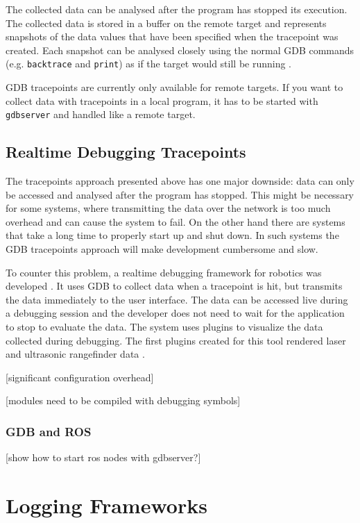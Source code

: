 The collected data can be analysed after the program has stopped its execution. The collected data is stored in a buffer on the remote target and represents snapshots of the data values that have been specified when the tracepoint was created. Each snapshot can be analysed closely using the normal GDB commands (e.g. \verb+backtrace+ and \verb+print+) as if the target would still be running \cite{Stallman2002}.

GDB tracepoints are currently only available for remote targets. If you want to collect data with tracepoints in a local program, it has to be started with \verb+gdbserver+ and handled like a remote target.

\subsection{Realtime Debugging Tracepoints}
The tracepoints approach presented above has one major downside: data can only be accessed and analysed after the program has stopped. This might be necessary for some systems, where transmitting the data over the network is too much overhead and can cause the system to fail. On the other hand there are systems that take a long time to properly start up and shut down. In such systems the GDB tracepoints approach will make development cumbersome and slow.

To counter this problem, a realtime debugging framework for robotics was developed \cite{Gumbley2009}. It uses GDB to collect data when a tracepoint is hit, but transmits the data immediately to the user interface. The data can be accessed live during a debugging session and the developer does not need to wait for the application to stop to evaluate the data. The system uses plugins to visualize the data collected during debugging. The first plugins created for this tool rendered laser and ultrasonic rangefinder data \cite{Gumbley2009}.

[significant configuration overhead]

[modules need to be compiled with debugging symbols]

\subsubsection{GDB and ROS}
[show how to start ros nodes with gdbserver?]


\section{Logging Frameworks}

